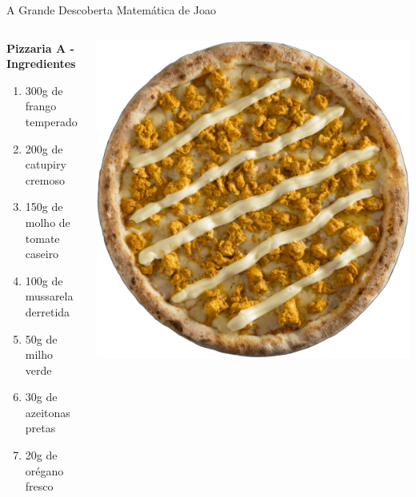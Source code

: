 \documentclass[12pt]{beamer}
\begin{document}
    \begin{frame}{A Grande Descoberta Matemática de Joao}
    
        \begin{columns}
        \begin{column}{0.6\textwidth}
       
            \textbf{Pizzaria A - Ingredientes}

            \begin{enumerate}
                \item 300g de frango temperado
                \item 200g de catupiry cremoso
                \item 150g de molho de tomate caseiro
                \item 100g de mussarela derretida
                \item 50g de milho verde
                \item 30g de azeitonas pretas
                \item 20g de orégano fresco
            \end{enumerate}
        \end{column}

        \begin{column}{0.4\textwidth}
            \centering
            \includegraphics[width=0.8\linewidth]{imagens/pizza_1.png}
        \end{column}
    \end{columns}
        
    \end{frame}
\end{document}
